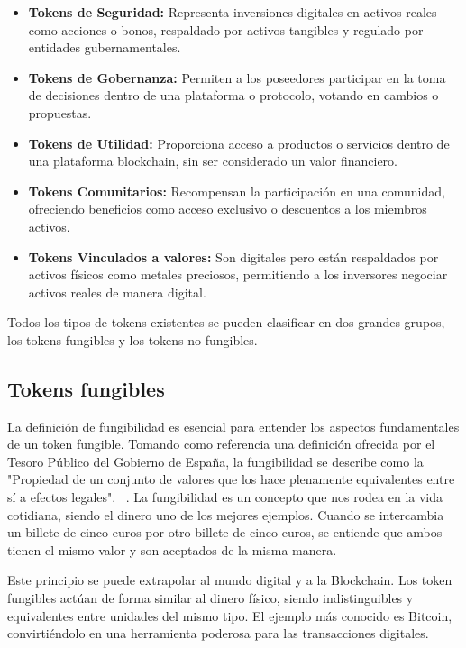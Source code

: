 \begin{itemize}
\item \textbf{Tokens de Seguridad:} Representa inversiones digitales en activos reales como acciones o bonos, respaldado por activos tangibles y regulado por entidades gubernamentales.
\item \textbf{Tokens de Gobernanza:} Permiten a los poseedores participar en la toma de decisiones dentro de una plataforma o protocolo, votando en cambios o propuestas.
\item \textbf{Tokens de Utilidad:} Proporciona acceso a productos o servicios dentro de una plataforma blockchain, sin ser considerado un valor financiero.
\item \textbf{Tokens Comunitarios:} Recompensan la participación en una comunidad, ofreciendo beneficios como acceso exclusivo o descuentos a los miembros activos.
\item \textbf{Tokens Vinculados a valores:} Son digitales pero están respaldados por activos físicos como metales preciosos, permitiendo a los inversores negociar activos reales de manera digital.

\end{itemize}

Todos los tipos de tokens existentes se pueden clasificar en dos grandes grupos, los tokens fungibles y los tokens no fungibles.


\subsection{Tokens fungibles}

La definición de fungibilidad es esencial para entender los aspectos fundamentales de un token fungible. Tomando como referencia una definición ofrecida por el Tesoro Público del Gobierno de España, la fungibilidad se describe como la "Propiedad de un conjunto de valores que los hace plenamente equivalentes entre sí a efectos legales". ~\cite{fungibilidadGob}.
La fungibilidad es un concepto que nos rodea en la vida cotidiana, siendo el dinero uno de los mejores ejemplos. Cuando se intercambia un billete de cinco euros por otro billete de cinco euros, se entiende que ambos tienen el mismo valor y son aceptados de la misma manera.

Este principio se puede extrapolar al mundo digital y a la Blockchain. Los token fungibles actúan de forma similar al dinero físico, siendo indistinguibles y equivalentes entre unidades del mismo tipo.
El ejemplo más conocido es Bitcoin, convirtiéndolo en una herramienta poderosa para las transacciones digitales.


